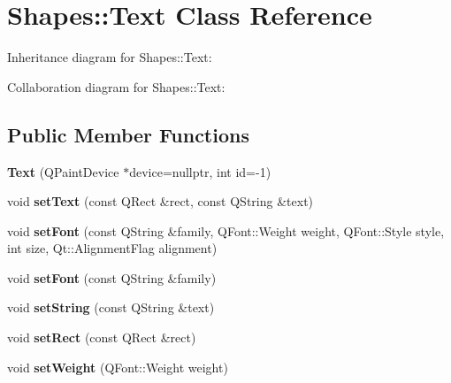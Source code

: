 \hypertarget{class_shapes_1_1_text}{}\section{Shapes\+::Text Class Reference}
\label{class_shapes_1_1_text}


Inheritance diagram for Shapes\+::Text\+:


Collaboration diagram for Shapes\+::Text\+:
\subsection*{Public Member Functions}
\begin{DoxyCompactItemize}
\item 
\mbox{\label{class_shapes_1_1_text_a92bc00c2caaecfba16d511e3baca680f}} 
{\bfseries Text} (Q\+Paint\+Device $\ast$device=nullptr, int id=-\/1)
\item 
\mbox{\label{class_shapes_1_1_text_a02b64a1424def58d34404ce3e3265510}} 
void {\bfseries set\+Text} (const Q\+Rect \&rect, const Q\+String \&text)
\item 
\mbox{\label{class_shapes_1_1_text_a267fcaa3f7d71bb0a23b8f9128b16253}} 
void {\bfseries set\+Font} (const Q\+String \&family, Q\+Font\+::\+Weight weight, Q\+Font\+::\+Style style, int size, Qt\+::\+Alignment\+Flag alignment)
\item 
\mbox{\label{class_shapes_1_1_text_a8afaaa8e17fdb5b038f063e18868db0b}} 
void {\bfseries set\+Font} (const Q\+String \&family)
\item 
\mbox{\label{class_shapes_1_1_text_ac606ffc412feec84fdc6fe845c8022c2}} 
void {\bfseries set\+String} (const Q\+String \&text)
\item 
\mbox{\label{class_shapes_1_1_text_a0f9ec1448a419ca6c1c19873dd854eff}} 
void {\bfseries set\+Rect} (const Q\+Rect \&rect)
\item 
\mbox{\label{class_shapes_1_1_text_a2c9cce0bb61fd443570fc53716945ee1}} 
void {\bfseries set\+Weight} (Q\+Font\+::\+Weight weight)
\item 

\end{DoxyCompactItemize}
